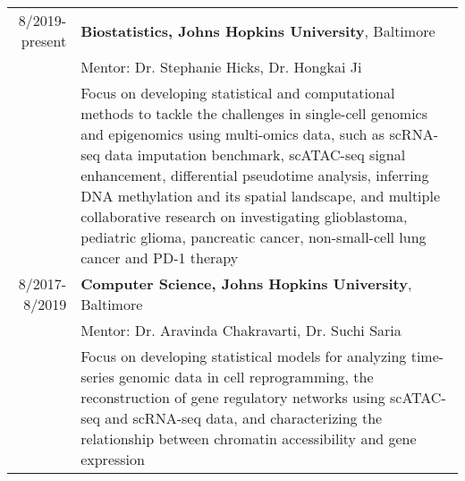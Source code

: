 \begin{longtable}{rX}
8/2019-present & {\bf Biostatistics, Johns Hopkins University}, Baltimore\\
& Mentor: Dr. Stephanie Hicks, Dr. Hongkai Ji\\
& Focus on developing statistical and computational methods to tackle the challenges in single-cell genomics and epigenomics using multi-omics data, such as scRNA-seq data imputation benchmark, scATAC-seq signal enhancement, differential pseudotime analysis, inferring DNA methylation and its spatial landscape, and multiple collaborative research on investigating glioblastoma, pediatric glioma, pancreatic cancer, non-small-cell lung cancer and PD-1 therapy\\
 8/2017-8/2019 & {\bf Computer Science, Johns Hopkins University}, Baltimore\\
& Mentor:  Dr. Aravinda Chakravarti, Dr. Suchi Saria \\
& Focus on developing statistical models for analyzing time-series genomic data in cell reprogramming, the reconstruction of gene regulatory networks using scATAC-seq and scRNA-seq data, and characterizing the relationship between chromatin accessibility and gene expression\\
\end{longtable}
